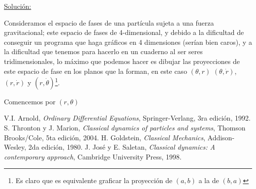 \documentclass[a4paper,10pt]{article}
\numberwithin{equation}{section}
\begin{document}
\vspace{.3cm}

\underline{Solución:} \vspace{.3cm}

Consideramos el espacio de fases de una partícula sujeta a una fuerza gravitacional;
este espacio de fases de 4-dimensional, y debido a la dificultad de conseguir un 
programa que haga gráficos en 4 dimensiones (serían bien caros), y a la dificultad 
que tenemos para hacerlo en un cuaderno al ser seres tridimensionales, lo máximo que 
podemos hacer es dibujar las proyecciones de este espacio de fase en los planos que
la forman, en este caso $(\theta,r)$ $(\theta,\dot{r})$, $(r,\dot{r})$ y $(r,\dot{\theta})$\footnote{
Es claro que es equivalente graficar la proyección de $(a,b)$ a la de $(b,a)$}.

\vspace{.3cm}

Comencemos por $(r,\theta)$



\begin{thebibliography}{10}
 V.I. Arnold, \emph{Ordinary Differential Equations}, Springer-Verlang,
 3ra edición, 1992.
 S. Thronton y J. Marion, \textit{Classical dynamics of particles and systems}, Thomson Brooks/Cole,
 5ta edición, 2004.
 H. Goldstein, \emph{Classical Mechanics}, Addison-Wesley, 2da edición,
 1980.
 J. José y E. Saletan, \emph{Classical dynamics: A contemporary approach}, Cambridge University Press,
 1998.
\end{thebibliography}
\end{document}

